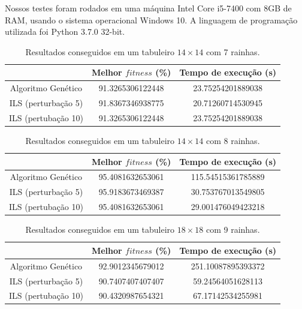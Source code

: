 \documentclass[
	article,			%
	11pt,				%
	oneside,			%
	a4paper,			%
	english,			%
	brazil,				%
	sumario=tradicional
	]{abntex2}
\begin{document}
Nossos testes foram rodados em uma máquina Intel Core i5-7400 com 8GB de RAM, usando o sistema operacional Windows 10. A linguagem de programação utilizada foi Python 3.7.0 32-bit.

  \begin{table}[ht]
    \caption{Resultados conseguidos em um tabuleiro $14 \times 14$ com 7 rainhas.}
    \centering
    \begin{tabular}{|c|c c|}
      \hline
      & Melhor $fitness$ (\%) & Tempo de execução (s) \\
      \hline
      Algoritmo Genético & 91.3265306122448 & 23.75254201889038 \\
      ILS (perturbação 5) & 91.8367346938775 & 20.71260714530945 \\
      ILS (pertubação 10) & 91.3265306122448 & 23.75254201889038 \\
      \hline
    \end{tabular}
    \label{tabela2}
  \end{table}

\begin{table}[ht]
  \caption{Resultados conseguidos em um tabuleiro $14 \times 14$ com 8 rainhas.}
  \centering
  \begin{tabular}{|c|c c|}
    \hline
     & Melhor $fitness$ (\%) & Tempo de execução (s) \\
     \hline
    Algoritmo Genético & 95.4081632653061 & 115.54515361785889 \\
    ILS (perturbação 5) & 95.9183673469387 & 30.753767013549805 \\
    ILS (pertubação 10) & 95.4081632653061 & 29.001476049423218 \\
    \hline
  \end{tabular}
  \label{tabela3}
\end{table}

\begin{table}[ht]
  \caption{Resultados conseguidos em um tabuleiro $18 \times 18$ com 9 rainhas.}
  \centering
  \begin{tabular}{| c|c c|}
    \hline
     & Melhor $fitness$ (\%) & Tempo de execução (s) \\
     \hline
    Algoritmo Genético & 92.9012345679012 & 251.10087895393372 \\
    ILS (perturbação 5) & 90.7407407407407 & 59.24564051628113 \\
    ILS (pertubação 10) & 90.4320987654321 & 67.17142534255981 \\
    \hline
  \end{tabular}
  \label{tabela4}
\end{table}
\end{document}

